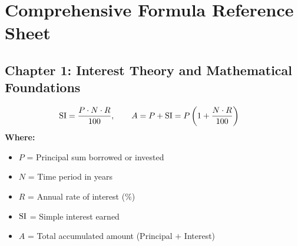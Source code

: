 \newpage
\thispagestyle{plain}
\chapter*{Comprehensive Formula Reference Sheet}

\section*{Chapter 1: Interest Theory and Mathematical Foundations}

\begin{formulabox}
\begin{align*}
    \operatorname{SI} &= \frac{P \cdot N \cdot R}{100}, \qquad A = P + \operatorname{SI} = P \left(1 + \frac{N \cdot R}{100}\right)
\end{align*}
\textbf{Where:}
\begin{itemize}[noitemsep, topsep=1pt]
    \item $P$ = Principal sum borrowed or invested
    \item $N$ = Time period in years
    \item $R$ = Annual rate of interest ($\%$)
    \item $\operatorname{SI}$ = Simple interest earned
    \item $A$ = Total accumulated amount (Principal $+$ Interest)
\end{itemize}
\end{formulabox}

